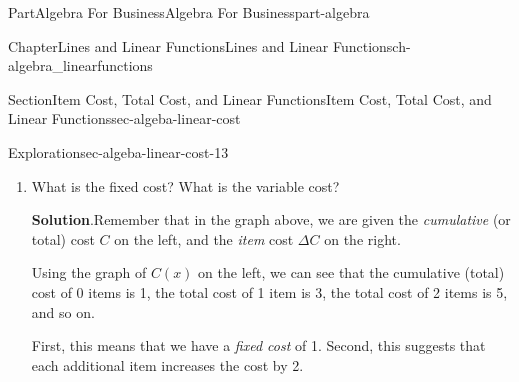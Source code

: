 \documentclass{tufte-book}
\newcommand{\blocktitlefont}{\relax}
\numberwithin{equation}{chapter}
\def \tikzhistogram (#1,#2){\draw[fill=blue,opacity=0.3] ({#1+((\xtwo-\xmin)/5)},#2) rectangle ({#1-((\xtwo-\xmin)/5)},0); \draw[draw,thick] ({#1+((\xtwo-\xmin)/5)},#2) rectangle ({#1-((\xtwo-\xmin)/5)},0); \node[draw,fill=blue, circle,inner sep=2.5pt] at (#1,#2) {};}
\begin{document}
\begin{partptx}{Part}{Algebra For Business}{}{Algebra For Business}{}{}{part-algebra}
\begin{chapterptx}{Chapter}{Lines and Linear Functions}{}{Lines and Linear Functions}{}{}{ch-algebra_linearfunctions}
\begin{sectionptx}{Section}{Item Cost, Total Cost, and Linear Functions}{}{Item Cost, Total Cost, and Linear Functions}{}{}{sec-algeba-linear-cost}
\begin{exploration}{Exploration}{}{sec-algeba-linear-cost-13}
\begin{image}{0.25}{0.5}{0.25}{}
{\begin{tikzpicture}[xscale=\xscale,yscale=\yscale]
\end{tikzpicture}
\quad
{}
}%
\end{image}%
\begin{enumerate}[font=\bfseries,label=(\alph*),ref=\alph*]%
\item{}What is the fixed cost? What is the variable cost?%
\par\smallskip%
\noindent\textbf{\blocktitlefont Solution}.\hypertarget{sec-algeba-linear-cost-13-2-2}{}\quad{}Remember that in the graph above, we are given the \emph{cumulative} (or total) cost \(C\) on the left, and the \emph{item} cost \(\Delta C\) on the right.%
\par
Using the graph of \(C(x)\) on the left, we can see that the cumulative (total) cost of 0 items is \textdollar{}1, the total cost of 1 item is \textdollar{}3, the total cost of 2 items is 5, and so on.%
\par
First, this means that we have a \emph{fixed cost} of \textdollar{}1.  Second, this suggests that each additional item increases the cost by \textdollar{}2.%

\end{enumerate}
\end{exploration}
\end{sectionptx}
\end{chapterptx}
\end{partptx}
\end{document}
